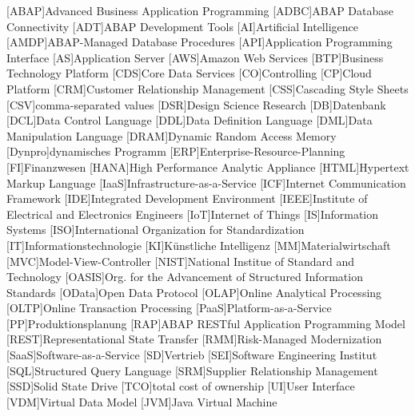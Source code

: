 

	\begin{acronym}[XXXXXXX]
		{Advanced Business Application Programming}
		{ABAP Database Connectivity}
		[ADT]{ABAP Development Tools}
		[AI]{Artificial Intelligence}
		{ABAP-Managed Database Procedures}
		[API]{Application Programming Interface}
		[AS]{Application Server}
		[AWS]{Amazon Web Services}
		[BTP]{Business Technology Platform}
		[CDS]{Core Data Services}
		[CO]{Controlling}
		[CP]{Cloud Platform}
		[CRM]{Customer Relationship Management}
		[CSS]{Cascading Style Sheets}
		[CSV]{comma-separated values}
		[DSR]{Design Science Research}
		[DB]{Datenbank}
		[DCL]{Data Control Language}
		[DDL]{Data Definition Language}
		[DML]{Data Manipulation Language}
		{Dynamic Random Access Memory}
		[Dynpro]{dynamisches Programm}
		[ERP]{Enterprise-Resource-Planning}
		[FI]{Finanzwesen}
		{High Performance Analytic Appliance}
		{Hypertext Markup Language}
		{Infrastructure-as-a-Service}
		[ICF]{Internet Communication Framework}
		[IDE]{Integrated Development Environment}
		{Institute of Electrical and Electronics Engineers}
		[IoT]{Internet of Things}
		[IS]{Information Systems}
		[ISO]{International Organization for Standardization}
		[IT]{Informationstechnologie}
		[KI]{Künstliche Intelligenz}
		[MM]{Materialwirtschaft}
		[MVC]{Model-View-Controller}
		{National Institue of Standard and Technology}
		[OASIS]{Org. for the Advancement of Structured Information Standards}
		[OData]{Open Data Protocol}
		{Online Analytical Processing}
		{Online Transaction Processing}
		{Platform-as-a-Service}
		[PP]{Produktionsplanung}
		[RAP]{ABAP RESTful Application Programming Model}
		{Representational State Transfer}
		[RMM]{Risk-Managed Modernization}
		{Software-as-a-Service}
		[SD]{Vertrieb}
		[SEI]{Software Engineering Institut}
		[SQL]{Structured Query Language}
		[SRM]{Supplier Relationship Management}
		[SSD]{Solid State Drive}
		[TCO]{total cost of ownership}
		[UI]{User Interface}
		[VDM]{Virtual Data Model}
		[JVM]{Java Virtual Machine}


\end{acronym}
